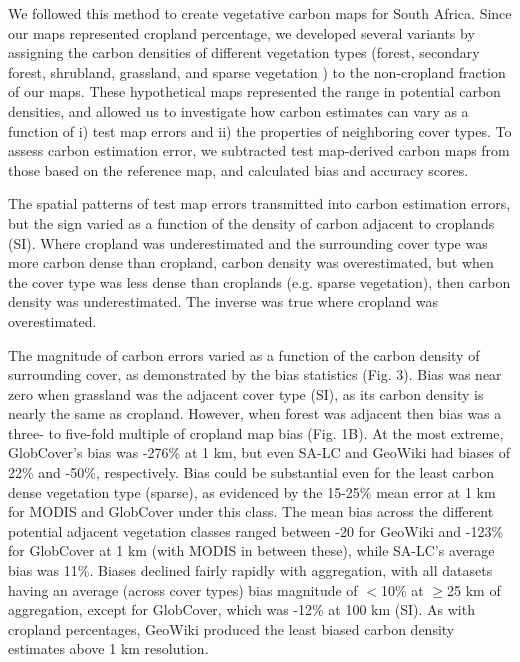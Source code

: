 \documentclass{pnastwo}
\begin{document}
\begin{article}
We followed this method to create vegetative carbon maps for South Africa. Since our maps represented cropland percentage, we developed several variants by assigning the carbon densities of different vegetation types (forest, secondary forest, shrubland, grassland, and sparse vegetation \cite{ruesch_new_2008}) to the non-cropland fraction of our maps. These hypothetical maps represented the range in potential carbon densities, and allowed us to investigate how carbon estimates can vary as a function of i) test map errors and ii) the properties of neighboring cover types. To assess carbon estimation error, we subtracted test map-derived carbon maps from those based on the reference map, and calculated bias and accuracy scores. 

The spatial patterns of test map errors transmitted into carbon estimation errors, but the sign varied as a function of the density of carbon adjacent to croplands (SI). Where cropland was underestimated and the surrounding cover type was more carbon dense than cropland, carbon density was overestimated, but when the cover type was less dense than croplands (e.g. sparse vegetation), then carbon density was underestimated. The inverse was true where cropland was overestimated. 

The magnitude of carbon errors varied as a function of the carbon density of surrounding cover, as demonstrated by the bias statistics (Fig. 3). Bias was near zero when grassland was the adjacent cover type (SI), as its carbon density is nearly the same as cropland. However, when forest was adjacent then bias was a three- to five-fold multiple of cropland map bias (Fig. 1B). At the most extreme, GlobCover's bias was -276\% at 1 km, but even SA-LC and GeoWiki had biases of 22\% and -50\%, respectively. Bias could be substantial even for the least carbon dense vegetation type (sparse), as evidenced by the 15-25\% mean error at 1 km for MODIS and GlobCover under this class.  The mean bias across the different potential adjacent vegetation classes ranged between -20 for GeoWiki and -123\% for GlobCover at 1 km (with MODIS in between these), while SA-LC's average bias was 11\%.  Biases declined fairly rapidly with aggregation, with all datasets having an average (across cover types) bias magnitude of $<$10\% at $\geq$25 km of aggregation, except for GlobCover, which was -12\% at 100 km (SI).  As with cropland percentages, GeoWiki produced the least biased carbon density estimates above 1 km resolution. 


\end{article}
\end{document}

